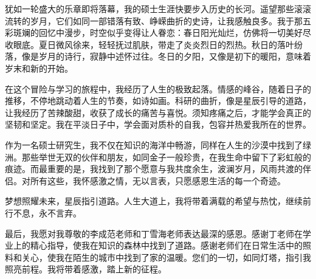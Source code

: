 \begin{acknowledgement}
  犹如一轮盛大的乐章即将落幕，我的硕士生涯快要步入历史的长河。遥望那些滚滚流转的岁月，它们如同一部错落有致、峥嵘曲折的史诗，让我感触良多。我于那五彩斑斓的回忆中漫步，时空似乎变得让人眷恋：春日阳光灿烂，仿佛将一切美好尽收眼底。夏日微风徐来，轻轻抚过肌肤，带走了炎炎烈日的烈热。秋日的落叶纷落，像是岁月的诗行，寂静中述怀过往。冬日的夕阳，又像是初下的暖阳，意味着岁末和新的开始。

  在这个冒险与学习的旅程中，我经历了人生的极致起落。情感的峰谷，随着日子的推移，不停地跳动着人生的节奏，如诗如画。科研的曲折，像是星辰引导的道路，让我经历了苦辣酸甜，收获了成长的痛苦与喜悦。须知疼痛之后，才能学会真正的坚韧和坚定。我在平淡日子中，学会面对质朴的自我，包容并热爱我所在的世界。

  作为一名硕士研究生，我不仅在知识的海洋中畅游，同样在人生的沙漠中找到了绿洲。那些举世无双的伙伴和朋友，如同金子一般珍贵，在我生命中留下了彩虹般的痕迹。而最重要的是，我找到了那个愿意与我共度余生，波澜岁月，风雨共渡的伴侣。对所有这些，我怀感激之情，无以言表，只愿感恩生活的每一个奇迹。

  梦想照耀未来，星辰指引道路。人生大道上，我将带着满载的希望与热忱，继续前行不息，永不言弃。

  最后，我愿对我尊敬的李成范老师和丁雪海老师表达最深的感恩。感谢丁老师在学业上的精心指导，使我在知识的森林中找到了道路。感谢老师们在日常生活中的照料和关心，使我在陌生的城市中找到了家的温暖。您们的一切，如同灯塔，指引我照亮前程。我将带着感激，踏上新的征程。

\end{acknowledgement}
